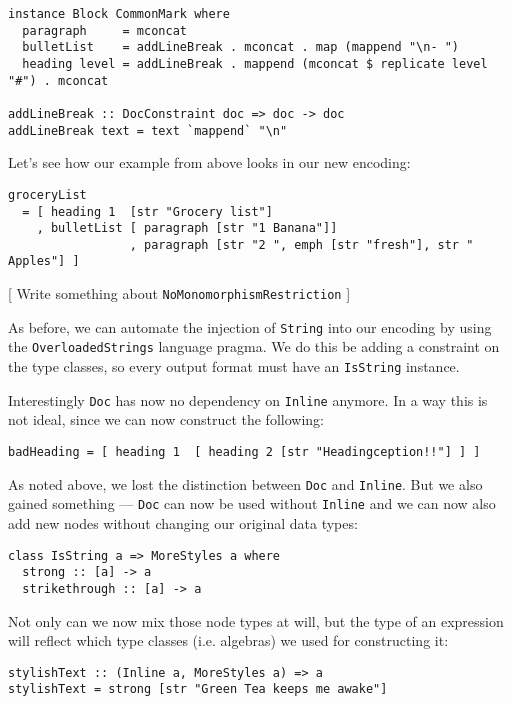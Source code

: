 \documentclass[format=acmsmall, review=true, screen=true]{acmart}
\begin{document}
\begin{lstlisting}
instance Block CommonMark where
  paragraph     = mconcat
  bulletList    = addLineBreak . mconcat . map (mappend "\n- ")
  heading level = addLineBreak . mappend (mconcat $ replicate level "#") . mconcat

addLineBreak :: DocConstraint doc => doc -> doc
addLineBreak text = text `mappend` "\n"
\end{lstlisting}

\clearpage

Let's see how our example from above looks in our new encoding:

\begin{lstlisting}
groceryList
  = [ heading 1  [str "Grocery list"]
    , bulletList [ paragraph [str "1 Banana"]]
                 , paragraph [str "2 ", emph [str "fresh"], str " Apples"] ]
\end{lstlisting}

[ Write something about \texttt{NoMonomorphismRestriction} ]

As before, we can automate the injection of \texttt{String} into our encoding by using
the \texttt{OverloadedStrings} language pragma. We do this be adding a constraint on
the type classes, so every output format must have an \texttt{IsString} instance.

Interestingly \texttt{Doc} has now no dependency on \texttt{Inline} anymore. In a way this is
not ideal, since we can now construct the following:

\begin{lstlisting}
badHeading = [ heading 1  [ heading 2 [str "Headingception!!"] ] ]
\end{lstlisting}

As noted above, we lost the distinction between \texttt{Doc} and \texttt{Inline}. But we also
gained something — \texttt{Doc} can now be used without \texttt{Inline} and we can now also
add new nodes without changing our original data types:

\begin{lstlisting}
class IsString a => MoreStyles a where
  strong :: [a] -> a
  strikethrough :: [a] -> a
\end{lstlisting}

Not only can we now mix those node types at will, but the type of an expression
will reflect which type classes (i.e. algebras) we used for constructing it:

\begin{lstlisting}
stylishText :: (Inline a, MoreStyles a) => a
stylishText = strong [str "Green Tea keeps me awake"]
\end{lstlisting}
\end{document}
